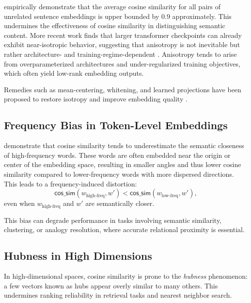 \documentclass[11pt]{article}
\newcommand{\cossim}{\textsf{cos\_sim}}
\begin{document}
\citet{liang_2021_LearningRemoveIsotropic} empirically demonstrate that the average cosine similarity for all pairs of unrelated sentence embeddings is upper bounded by 0.9 approximately. This undermines the effectiveness of cosine similarity in distinguishing semantic content. More recent work finds that larger transformer checkpoints can already exhibit near-isotropic behavior, suggesting that anisotropy is not inevitable but rather architecture- and training-regime-dependent \citep{machina_2024_AnisotropyNotInherent}. Anisotropy tends to arise from overparameterized architectures and under-regularized training objectives, which often yield low-rank embedding outputs. 

Remedies such as {mean-centering}, {whitening}, and {learned projections} have been proposed to restore isotropy and improve embedding quality \citep{gao_2021_SimCSESimpleContrastive, reimers_2019_SentenceBERTSentenceEmbeddings}.


\subsection{Frequency Bias in Token-Level Embeddings}

\citet{zhou_2022_ProblemsCosineMeasure} demonstrate that cosine similarity tends to underestimate the semantic closeness of high-frequency words. These words are often embedded near the origin or center of the embedding space, resulting in smaller angles and thus lower cosine similarity compared to lower-frequency words with more dispersed directions. This leads to a frequency-induced distortion:
\begin{equation*}
\cossim(w_{\text{high-freq}}, w') < \cossim(w_{\text{low-freq}}, w'),
\end{equation*}
even when $w_{\text{high-freq}}$ and $w'$ are semantically closer. 

This bias can degrade performance in tasks involving semantic similarity, clustering, or analogy resolution, where accurate relational proximity is essential.


\subsection{Hubness in High Dimensions}

In high-dimensional spaces, cosine similarity is prone to the \textit{hubness} phenomenon: a few vectors known as hubs appear overly similar to many others. This undermines ranking reliability in retrieval tasks and nearest neighbor search.
\end{document}
